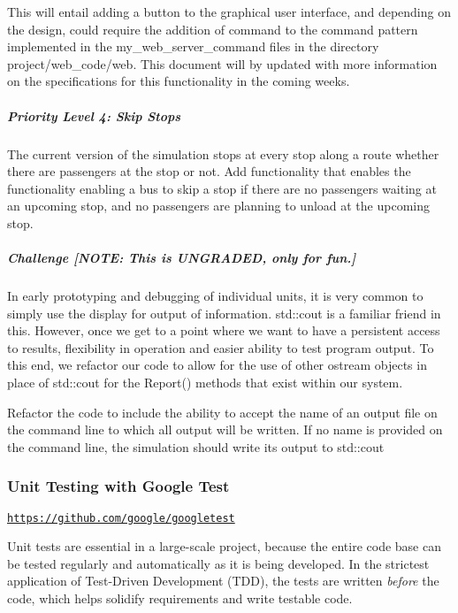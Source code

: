 This will entail adding a button to the graphical user interface, and depending on the design, could require the addition of command to the command pattern implemented in the {\ttfamily my\+\_\+web\+\_\+server\+\_\+command} files in the directory {\ttfamily project/web\+\_\+code/web}. This document will by updated with more information on the specifications for this functionality in the coming weeks.

\subparagraph*{Priority Level 4\+: Skip Stops}

The current version of the simulation stops at every stop along a route whether there are passengers at the stop or not. Add functionality that enables the functionality enabling a bus to skip a stop if there are no passengers waiting at an upcoming stop, and no passengers are planning to unload at the upcoming stop.

\subparagraph*{Challenge \mbox{[}N\+O\+TE\+: This is U\+N\+G\+R\+A\+D\+ED, only for fun.\mbox{]}}

In early prototyping and debugging of individual units, it is very common to simply use the display for output of information. std\+::cout is a familiar friend in this. However, once we get to a point where we want to have a persistent access to results, flexibility in operation and easier ability to test program output. To this end, we refactor our code to allow for the use of other ostream objects in place of std\+::cout for the \textquotesingle{}Report() \textquotesingle{}methods that exist within our system.

Refactor the code to include the ability to accept the name of an output file on the command line to which all output will be written. If no name is provided on the command line, the simulation should write its output to std\+::cout





\subsubsection*{Unit Testing with Google Test}

\href{https://github.com/google/googletest}{\tt https\+://github.\+com/google/googletest}

Unit tests are essential in a large-\/scale project, because the entire code base can be tested regularly and automatically as it is being developed. In the strictest application of Test-\/\+Driven Development (T\+DD), the tests are written {\itshape before} the code, which helps solidify requirements and write testable code.

